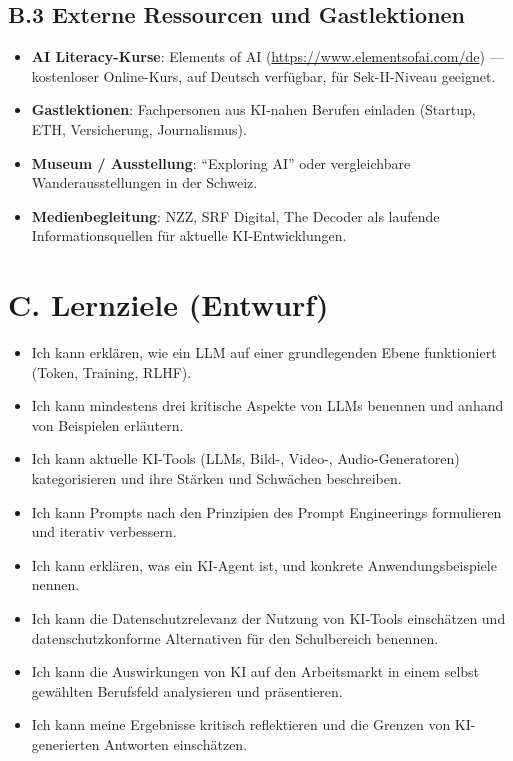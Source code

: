 \subsection*{B.3 Externe Ressourcen und Gastlektionen}

\begin{itemize}
    \item \textbf{AI Literacy-Kurse}: Elements of AI (\url{https://www.elementsofai.com/de})
          --- kostenloser Online-Kurs, auf Deutsch verfügbar, für Sek-II-Niveau geeignet.
    \item \textbf{Gastlektionen}: Fachpersonen aus KI-nahen Berufen einladen
          (Startup, ETH, Versicherung, Journalismus).
    \item \textbf{Museum / Ausstellung}: \enquote{Exploring AI} oder vergleichbare
          Wanderausstellungen in der Schweiz.
    \item \textbf{Medienbegleitung}: NZZ, SRF Digital, The Decoder als laufende
          Informationsquellen für aktuelle KI-Entwicklungen.
\end{itemize}

\section*{C. Lernziele (Entwurf)}

\begin{itemize}
    \item Ich kann erklären, wie ein LLM auf einer grundlegenden Ebene funktioniert
          (Token, Training, RLHF).
    \item Ich kann mindestens drei kritische Aspekte von LLMs benennen und anhand
          von Beispielen erläutern.
    \item Ich kann aktuelle KI-Tools (LLMs, Bild-, Video-, Audio-Generatoren)
          kategorisieren und ihre Stärken und Schwächen beschreiben.
    \item Ich kann Prompts nach den Prinzipien des Prompt Engineerings formulieren
          und iterativ verbessern.
    \item Ich kann erklären, was ein KI-Agent ist, und konkrete Anwendungsbeispiele
          nennen.
    \item Ich kann die Datenschutzrelevanz der Nutzung von KI-Tools einschätzen
          und datenschutzkonforme Alternativen für den Schulbereich benennen.
    \item Ich kann die Auswirkungen von KI auf den Arbeitsmarkt in einem selbst
          gewählten Berufsfeld analysieren und präsentieren.
    \item Ich kann meine Ergebnisse kritisch reflektieren und die Grenzen
          von KI-generierten Antworten einschätzen.
\end{itemize}

